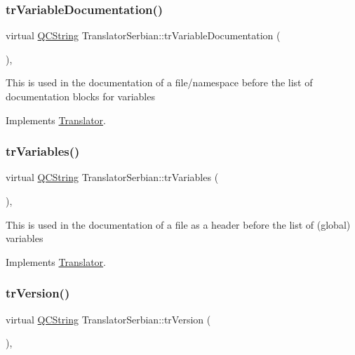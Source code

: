 \subsubsection{\texorpdfstring{trVariableDocumentation()}{trVariableDocumentation()}}
{\footnotesize\ttfamily virtual \mbox{\hyperlink{class_q_c_string}{Q\+C\+String}} Translator\+Serbian\+::tr\+Variable\+Documentation (\begin{DoxyParamCaption}{ }\end{DoxyParamCaption})\hspace{0.3cm}{\ttfamily [inline]}, {\ttfamily [virtual]}}

This is used in the documentation of a file/namespace before the list of documentation blocks for variables 

Implements \mbox{\hyperlink{class_translator}{Translator}}.

\mbox{\label{class_translator_serbian_aa2b3c902f5f87ceb7823df3fa6e142bc}} 
\subsubsection{\texorpdfstring{trVariables()}{trVariables()}}
{\footnotesize\ttfamily virtual \mbox{\hyperlink{class_q_c_string}{Q\+C\+String}} Translator\+Serbian\+::tr\+Variables (\begin{DoxyParamCaption}{ }\end{DoxyParamCaption})\hspace{0.3cm}{\ttfamily [inline]}, {\ttfamily [virtual]}}

This is used in the documentation of a file as a header before the list of (global) variables 

Implements \mbox{\hyperlink{class_translator}{Translator}}.

\mbox{\label{class_translator_serbian_ad6c80c2106b594399e9e20133e591a19}} 
\subsubsection{\texorpdfstring{trVersion()}{trVersion()}}
{\footnotesize\ttfamily virtual \mbox{\hyperlink{class_q_c_string}{Q\+C\+String}} Translator\+Serbian\+::tr\+Version (\begin{DoxyParamCaption}{ }\end{DoxyParamCaption})\hspace{0.3cm}{\ttfamily [inline]}, {\ttfamily [virtual]}}

